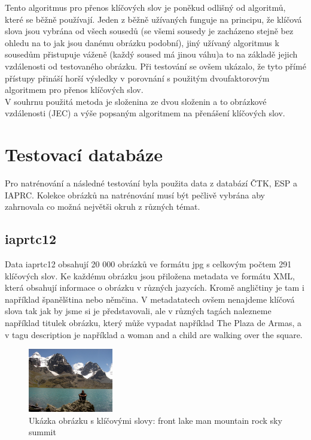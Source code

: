 \documentclass[czech,BP]{thesiskiv}
\begin{document}
Tento algoritmus pro přenos klíčových slov je poněkud odlišný od algoritmů, které se běžně používají. Jeden z běžně užívaných funguje na principu, že klíčová slova jsou vybrána od všech sousedů (se všemi sousedy je zacházeno stejně bez ohledu na to jak jsou danému obrázku podobní), jiný užívaný algoritmus k sousedům přistupuje váženě (každý soused má jinou váhu)a to na základě jejich vzdálenosti od testovaného obrázku. Při testování se ovšem ukázalo, že tyto přímé přístupy přináší horší výsledky v porovnání s použitým dvoufaktorovým algoritmem pro přenos klíčových slov. \\
V souhrnu použitá metoda je složenina ze dvou složenin a to obrázkové vzdálenosti (JEC) a výše popsaným algoritmem na přenášení klíčových slov.

\chapter{Testovací databáze}
Pro natrénování a následné testování byla použita data z databází ČTK, ESP a IAPRC. Kolekce obrázků na natrénování musí být pečlivě vybrána aby zahrnovala co možná největši okruh z různých témat.

\section{iaprtc12}
Data iaprtc12 obsahují 20 000 obrázků ve formátu jpg s celkovým počtem 291 klíčových slov. Ke každému obrázku jsou přiložena metadata ve formátu XML, která obsahují informace o obrázku v různých jazycích. Kromě angličtiny je tam i například španělština nebo němčina. V metadatatech ovšem nenajdeme klíčová slova tak jak by jsme si je představovali, ale v různých tagách nalezneme například titulek obrázku, který může vypadat například The Plaza de Armas, a v tagu description je například  a woman and a child are walking over the square.

\begin{figure}[h]
		\centering
		\includegraphics[width=140px]{./img/iaprtc12.jpg}	
		\caption{Ukázka obrázku s klíčovými slovy: front lake man mountain rock sky summit}
\end{figure}
\end{document}

